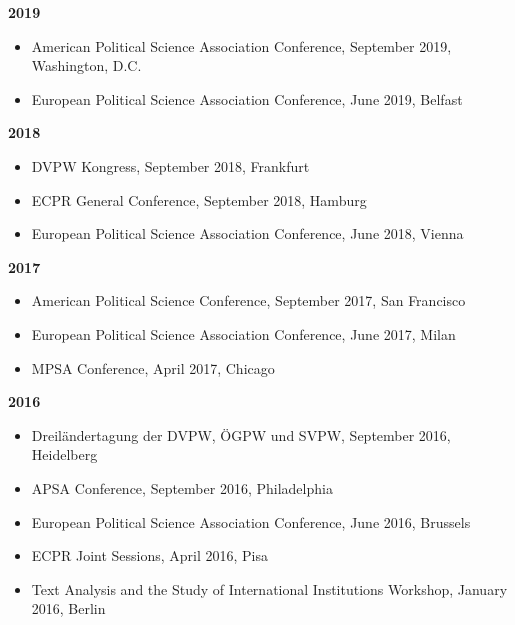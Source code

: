 \vspace{\baselineskip}

\textbf{2019}
\begin{itemize}[topsep=0pt, noitemsep, leftmargin=3]
	\item American Political Science Association Conference, September 2019, Washington, D.C.
	\item European Political Science Association Conference, June 2019, Belfast
\end{itemize}

\vspace{\baselineskip}

\textbf{2018}
\begin{itemize}[topsep=0pt, noitemsep, leftmargin=3]
	\item DVPW Kongress, September 2018, Frankfurt
	\item ECPR General Conference, September 2018, Hamburg
	\item European Political Science Association Conference, June 2018, Vienna
\end{itemize}

\vspace{\baselineskip}

\textbf{2017}
\begin{itemize}[topsep=0pt, noitemsep, leftmargin=3]
	\item American Political Science Conference, September 2017, San Francisco
	\item European Political Science Association Conference, June 2017, Milan
	\item MPSA Conference, April 2017, Chicago
\end{itemize}

\vspace{\baselineskip}

\textbf{2016}
\begin{itemize}[topsep=0pt, noitemsep, leftmargin=3]
	\item Dreiländertagung der DVPW, ÖGPW und SVPW, September 2016, Heidelberg
	\item APSA Conference, September 2016, Philadelphia
	\item European Political Science Association Conference, June 2016, Brussels
	\item ECPR Joint Sessions, April 2016, Pisa
	\item Text Analysis and the Study of International Institutions Workshop, January 2016, Berlin
\end{itemize}

